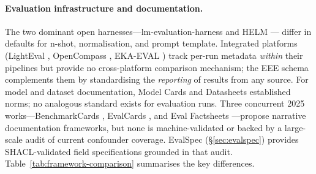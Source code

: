 \documentclass[11pt]{article}
\begin{document}
\paragraph{Evaluation infrastructure and documentation.}
The two dominant open harnesses---lm-evaluation-harness
\citep{gao-2021-framework} and HELM \citep{liang-2022-holistic}---
differ in defaults for n-shot, normalisation, and prompt template.
Integrated platforms (LightEval \citep{fourrier-2024-lighteval},
OpenCompass \citep{contributors-2023-opencompass}, EKA-EVAL
\citep{kim-2025-ekaeval}) track per-run metadata \emph{within}
their pipelines but provide no cross-platform comparison mechanism;
the EEE schema complements them by standardising the
\emph{reporting} of results from any source. For model and dataset
documentation, Model Cards \citep{mitchell-2019-modelcards} and
Datasheets \citep{gebru-2021-datasheets} established norms; no
analogous standard exists for evaluation runs. Three concurrent
2025 works---BenchmarkCards \citep{sokol2025benchmarkcards},
EvalCards \citep{dhar2025evalcards}, and Eval Factsheets
\citep{bordes2025factsheets}---propose narrative documentation
frameworks, but none is machine-validated or backed by a
large-scale audit of current confounder coverage. EvalSpec
(\S\ref{sec:evalspec}) provides SHACL-validated field
specifications grounded in that audit.
Table~\ref{tab:framework-comparison} summarises the key
differences.
\end{document}

